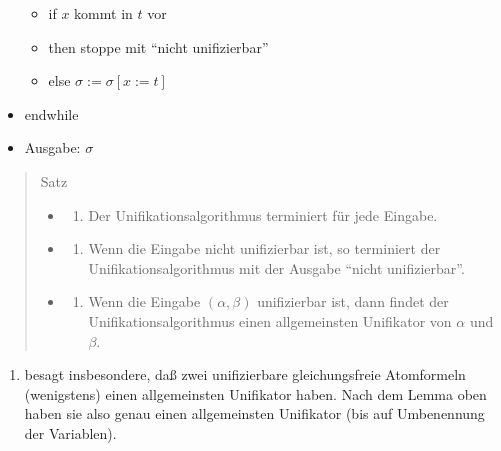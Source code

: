 \documentclass[a4paper]{article}
\begin{document}
\begin{multicols}{3}
\begin{itemize}
          \begin{itemize}
            \item
                  if $x$ kommt in $t$ vor
            \item
                  then stoppe mit ``nicht unifizierbar''
            \item
                  else $\sigma:=\sigma[x:=t]$
          \end{itemize}
    \item
          endwhile
    \item
          Ausgabe: $\sigma$
  \end{itemize}

  \begin{quote}
    Satz

    \begin{itemize}
      \item
            \begin{enumerate}
              \def\labelenumi{(\Alph{enumi})}
              \item
                    Der Unifikationsalgorithmus terminiert für jede Eingabe.
            \end{enumerate}
      \item
            \begin{enumerate}
              \def\labelenumi{(\Alph{enumi})}
              \setcounter{enumi}{1}
              \item
                    Wenn die Eingabe nicht unifizierbar ist, so terminiert der
                    Unifikationsalgorithmus mit der Ausgabe ``nicht unifizierbar''.
            \end{enumerate}
      \item
            \begin{enumerate}
              \def\labelenumi{(\Alph{enumi})}
              \setcounter{enumi}{2}
              \item
                    Wenn die Eingabe $(\alpha,\beta)$ unifizierbar ist, dann findet der
                    Unifikationsalgorithmus einen allgemeinsten Unifikator von $\alpha$
                    und $\beta$.
            \end{enumerate}
    \end{itemize}
  \end{quote}

  \begin{enumerate}
    \def\labelenumi{(\Alph{enumi})}
    \setcounter{enumi}{2}
    \itemsep1pt\parskip0pt
    \item
          besagt insbesondere, daß zwei unifizierbare gleichungsfreie
          Atomformeln (wenigstens) einen allgemeinsten Unifikator haben. Nach
          dem Lemma oben haben sie also genau einen allgemeinsten Unifikator
          (bis auf Umbenennung der Variablen).
  \end{enumerate}


\end{multicols}
\end{document}
